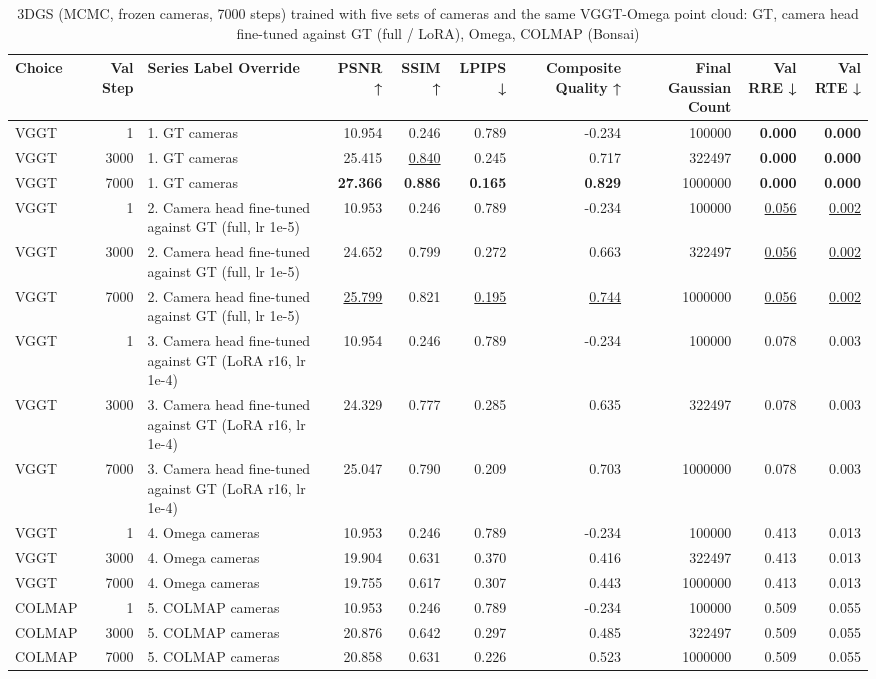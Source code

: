 \begin{table}[H]
\caption{\ifdefined\customcaption \customcaption \else 3DGS (MCMC, frozen cameras, 7000 steps) trained with five sets of cameras and the same VGGT-Omega point cloud: GT, camera head fine-tuned against GT (full / LoRA), Omega, COLMAP (Bonsai) \fi}
\label{tab:102_omega_cameras_7k_bonsai}
\centering
\tiny
\begin{tabular}{lrlrrrrrrr}
\toprule
Choice & Val Step & Series Label Override & PSNR ↑ & SSIM ↑ & LPIPS ↓ & Composite Quality ↑ & Final Gaussian Count & Val RRE ↓ & Val RTE ↓ \\
\midrule
VGGT & 1 & 1. GT cameras & 10.954 & 0.246 & 0.789 & -0.234 & 100000 & \textbf{0.000} & \textbf{0.000} \\
VGGT & 3000 & 1. GT cameras & 25.415 & \underline{0.840} & 0.245 & 0.717 & 322497 & \textbf{0.000} & \textbf{0.000} \\
VGGT & 7000 & 1. GT cameras & \textbf{27.366} & \textbf{0.886} & \textbf{0.165} & \textbf{0.829} & 1000000 & \textbf{0.000} & \textbf{0.000} \\
VGGT & 1 & 2. Camera head fine-tuned against GT (full, lr 1e-5) & 10.953 & 0.246 & 0.789 & -0.234 & 100000 & \underline{0.056} & \underline{0.002} \\
VGGT & 3000 & 2. Camera head fine-tuned against GT (full, lr 1e-5) & 24.652 & 0.799 & 0.272 & 0.663 & 322497 & \underline{0.056} & \underline{0.002} \\
VGGT & 7000 & 2. Camera head fine-tuned against GT (full, lr 1e-5) & \underline{25.799} & 0.821 & \underline{0.195} & \underline{0.744} & 1000000 & \underline{0.056} & \underline{0.002} \\
VGGT & 1 & 3. Camera head fine-tuned against GT (LoRA r16, lr 1e-4) & 10.954 & 0.246 & 0.789 & -0.234 & 100000 & 0.078 & 0.003 \\
VGGT & 3000 & 3. Camera head fine-tuned against GT (LoRA r16, lr 1e-4) & 24.329 & 0.777 & 0.285 & 0.635 & 322497 & 0.078 & 0.003 \\
VGGT & 7000 & 3. Camera head fine-tuned against GT (LoRA r16, lr 1e-4) & 25.047 & 0.790 & 0.209 & 0.703 & 1000000 & 0.078 & 0.003 \\
VGGT & 1 & 4. Omega cameras & 10.953 & 0.246 & 0.789 & -0.234 & 100000 & 0.413 & 0.013 \\
VGGT & 3000 & 4. Omega cameras & 19.904 & 0.631 & 0.370 & 0.416 & 322497 & 0.413 & 0.013 \\
VGGT & 7000 & 4. Omega cameras & 19.755 & 0.617 & 0.307 & 0.443 & 1000000 & 0.413 & 0.013 \\
COLMAP & 1 & 5. COLMAP cameras & 10.953 & 0.246 & 0.789 & -0.234 & 100000 & 0.509 & 0.055 \\
COLMAP & 3000 & 5. COLMAP cameras & 20.876 & 0.642 & 0.297 & 0.485 & 322497 & 0.509 & 0.055 \\
COLMAP & 7000 & 5. COLMAP cameras & 20.858 & 0.631 & 0.226 & 0.523 & 1000000 & 0.509 & 0.055 \\
\bottomrule
\end{tabular}
\end{table}